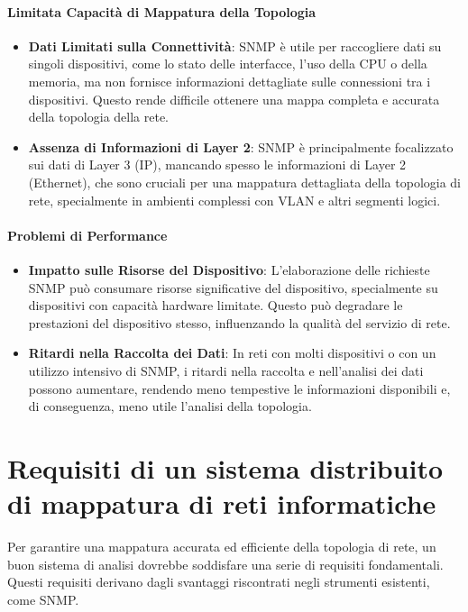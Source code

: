 \documentclass[target=bach,aauheader=,style=]{thud}
\begin{document}
\subsubsection{Limitata Capacità di Mappatura della Topologia}
    \begin{itemize}
      \item \textbf{Dati Limitati sulla Connettività}: SNMP è utile per raccogliere dati su singoli dispositivi, come lo stato delle interfacce, l'uso della CPU o della memoria, ma non fornisce informazioni dettagliate sulle connessioni tra i dispositivi. Questo rende difficile ottenere una mappa completa e accurata della topologia della rete.
      \item \textbf{Assenza di Informazioni di Layer 2}: SNMP è principalmente focalizzato sui dati di Layer 3 (IP), mancando spesso le informazioni di Layer 2 (Ethernet), che sono cruciali per una mappatura dettagliata della topologia di rete, specialmente in ambienti complessi con VLAN e altri segmenti logici.
    \end{itemize}


\subsubsection{Problemi di Performance}
    \begin{itemize}
      \item \textbf{Impatto sulle Risorse del Dispositivo}: L'elaborazione delle richieste SNMP può consumare risorse significative del dispositivo, specialmente su dispositivi con capacità hardware limitate. Questo può degradare le prestazioni del dispositivo stesso, influenzando la qualità del servizio di rete.
      \item \textbf{Ritardi nella Raccolta dei Dati}: In reti con molti dispositivi o con un utilizzo intensivo di SNMP, i ritardi nella raccolta e nell'analisi dei dati possono aumentare, rendendo meno tempestive le informazioni disponibili e, di conseguenza, meno utile l'analisi della topologia.
    \end{itemize}

\chapter{Requisiti di un sistema distribuito di mappatura di reti informatiche}
Per garantire una mappatura accurata ed efficiente della topologia di rete, un buon sistema di analisi dovrebbe soddisfare una serie di requisiti fondamentali. Questi requisiti derivano dagli svantaggi riscontrati negli strumenti esistenti, come SNMP.
\end{document}
